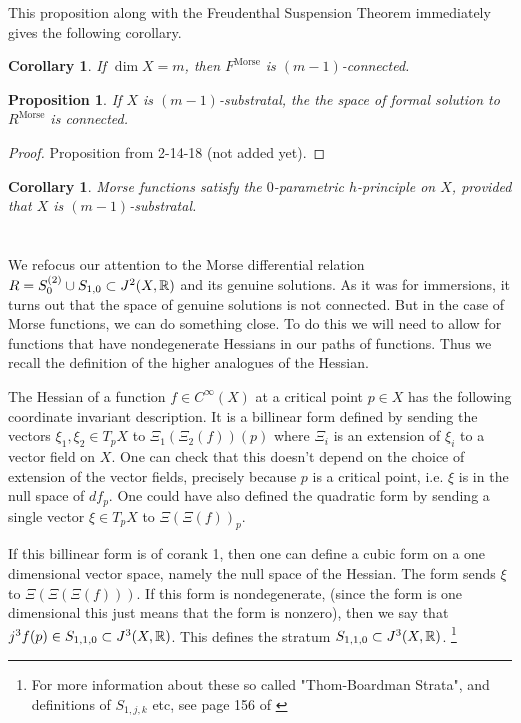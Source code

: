 \documentclass{article}
\newtheorem{proposition}[theorem]{Proposition}
\newtheorem{corollary}[theorem]{Corollary}
\newtheorem{proposed work}[theorem]{Proposed Work}
\DeclareMathOperator{\Morse}{Morse}
\begin{document}
This proposition along with the Freudenthal Suspension Theorem \cite{may1999concise} immediately gives the following corollary.

\begin{corollary}
If $\dim X = m$, then $F^{\Morse}$ is $(m-1)$-connected.
\end{corollary}

\begin{proposition}
If $X$ is $(m-1)$-substratal, the the space of formal solution to $R^{\Morse}$ is connected.
\end{proposition}

\begin{proof}
Proposition from 2-14-18 (not added yet).
\end{proof}

\begin{corollary}
Morse functions satisfy the $0$-parametric $h$-principle on $X$, provided that $X$ is $(m-1)$-substratal.
\end{corollary}




\section{}

We refocus our attention to the Morse differential relation $R=S^{(2)}_0 \cup S_{1,0} \subset J^2(X,\mathbb R)$ and its genuine solutions.  As it was for immersions, it turns out that the space of genuine solutions is not connected.  But in the case of Morse functions, we can do something close.  To do this we will need to allow for functions that have nondegenerate Hessians in our paths of functions. Thus we recall the definition of the higher analogues of the Hessian.

The Hessian of a function $f \in C^\infty(X)$ at a critical point $p \in X$ has the following coordinate invariant description.  It is a billinear form defined by sending the vectors $\xi_1, \xi_2 \in T_pX$ to $\Xi_1(\Xi_2(f))(p)$ where $\Xi_i$ is an extension of $\xi_i$ to a vector field on $X$.  One can check that this doesn't depend on the choice of extension of the vector fields, precisely because $p$ is a critical point, i.e. $\xi$ is in the null space of $df_p$.  One could have also defined the quadratic form by sending a single vector $\xi \in T_pX$ to $\Xi(\Xi(f))_p$.

If this billinear form is of corank 1, then one can define a cubic form on a one dimensional vector space, namely the null space of the Hessian.  The form sends $\xi$ to $\Xi(\Xi(\Xi(f)))$.  If this form is nondegenerate, (since the form is one dimensional this just means that the form is nonzero), then we say that $j^3f(p) \in S_{1,1,0}\subset J^3(X,\mathbb R)$.  This defines the stratum $S_{1,1,0} \subset J^3(X,\mathbb R)$.   \footnote{ For more information about these so called "Thom-Boardman Strata", and definitions of $S_{1,j,k}$ etc, see page 156 of \cite{strata}}
\end{document}

